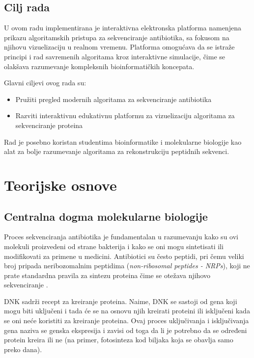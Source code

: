 \documentclass[12pt,oneside]{memoir}
\begin{document}
\section{Cilj rada}
U ovom radu implementirana je interaktivna elektronska platforma namenjena prikazu algoritamskih pristupa za sekvenciranje antibiotika, sa fokusom na njihovu vizuelizaciju u realnom vremenu. Platforma omogućava da se istraže principi i rad savremenih algoritama kroz interaktivne simulacije, čime se olakšava razumevanje kompleksnih bioinformatičkih koncepata.

Glavni ciljevi ovog rada su:
\begin{itemize}
    \item Pružiti pregled modernih algoritama za sekvenciranje antibiotika
    \item Razviti interaktivnu edukativnu platformu za vizuelizaciju algoritama za sekvenciranje proteina
\end{itemize}

Rad je posebno koristan studentima bioinformatike i molekularne biologije kao alat za bolje razumevanje algoritama za rekonstrukciju peptidnih sekvenci.

\chapter{Teorijske osnove}

\section{Centralna dogma molekularne biologije}
Proces sekvenciranja antibiotika je fundamentalan u razumevanju kako su ovi molekuli proizvedeni od strane bakterija i kako se oni mogu sintetisati ili modifikovati za primene u medicini. Antibiotici su često peptidi, pri čemu veliki broj pripada neribozomalnim peptidima (\emph{non-ribosomal peptides - NRPs}), koji ne prate standardna pravila za sintezu proteina čime se otežava njihovo sekvenciranje \cite{online_lecture, online_book}.

DNK sadrži recept za kreiranje proteina. Naime, DNK se sastoji od gena koji mogu biti uključeni i tada će se na osnovu njih kreirati proteini ili isključeni kada se oni neće koristiti za kreiranje proteina. Ovaj proces uključivanja i isključivanja gena naziva se genska ekspresija i zavisi od toga da li je potrebno da se određeni protein kreira ili ne (na primer, fotosinteza kod biljaka koja se obavlja samo preko dana).
\end{document}
